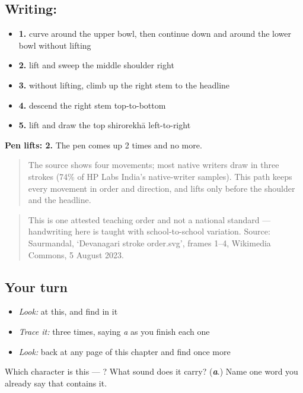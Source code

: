 \subsection*{Writing: }

\begin{itemize}
\raggedright
  \item \textbf{1.} curve around the upper bowl, then continue down and around the lower bowl without lifting
  \item \textbf{2.} lift and sweep the middle shoulder right
  \item \textbf{3.} without lifting, climb up the right stem to the headline
  \item \textbf{4.} descend the right stem top-to-bottom
  \item \textbf{5.} lift and draw the top shirorekhā left-to-right
\end{itemize}

\textbf{Pen lifts: 2.} The pen comes up 2 times and no more.

\begin{quote}
The source shows four movements; most native writers draw  in three strokes (74\% of HP Labs India's native-writer samples). This path keeps every movement in order and direction, and lifts only before the shoulder and the headline.
\end{quote}

\begin{quote}
This is one attested teaching order and not a national standard — handwriting here is taught with school-to-school variation. Source: Saurmandal, ‘Devanagari  stroke order.svg’, frames 1–4, Wikimedia Commons, 5 August 2023.
\end{quote}

\subsection*{Your turn}
\begin{itemize}
\raggedright
  \item \emph{Look:} at this, and find  in it
\end{itemize}

\begin{quote}
\end{quote}

\begin{itemize}
\raggedright
  \item \emph{Trace it:}  three times, saying \emph{a} as you finish each one
  \item \emph{Look:} back at any page of this chapter and find  once more
\end{itemize}

\begin{tcolorbox}[breakable,colback=teal!4,colframe=teal!35!black,title={Before you move on}]
Which character is this — ? What sound does it carry? (\emph{\textbf{a}}.) Name one word you already say that contains it.
\end{tcolorbox}
